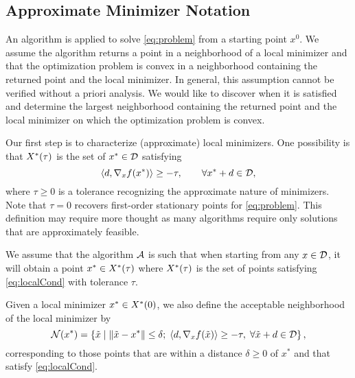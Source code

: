 \subsection{Approximate Minimizer Notation}

An algorithm is applied to solve \eqref{eq:problem} from a starting 
point $x^0$.  We assume the algorithm returns a point in a
neighborhood of a local minimizer and that the optimization 
problem is convex in a neighborhood containing the returned 
point and the local minimizer.  In general, this assumption 
cannot be verified without a priori analysis.  We would
like to discover when it is satisfied and determine the 
largest neighborhood containing the returned point and 
the local minimizer on which the optimization problem 
is convex.

Our first step is to characterize (approximate) local minimizers. One 
possibility is that $X^*(\tau)$ is the set of $x^*\in\mathcal{D}$ satisfying
\begin{equation}
 \left \langle d, \nabla_x f(x^*)\right \rangle \geq -\tau, \qquad \forall 
x^*+d\in \mathcal{D},
 \label{eq:localCond}
\end{equation}
where $\tau\geq 0$ is a tolerance recognizing the approximate nature of 
minimizers.  Note that $\tau=0$ recovers first-order stationary points 
for \eqref{eq:problem}.  This definition may require more thought as
many algorithms require only solutions that are approximately 
feasible.


We assume that the algorithm $\mathcal{A}$ is such that when starting from any $x\in 
\mathcal{D}$, it will obtain a point $x^*\in X^*(\tau)$ where $X^*(\tau)$ is the
set of points satisfying \eqref{eq:localCond} with tolerance $\tau$.

Given a local minimizer $x^*\in X^*(0)$, we also define the acceptable 
neighborhood of the local minimizer by
\[
\mathcal{N}(x^*) = \left\{ \tilde{x} \; | \; \|\tilde{x} - x^*\| \leq 
\delta; \;  \left \langle d, \nabla_x f(\tilde{x})\right \rangle \geq -\tau, \; 
\forall \tilde{x}+d\in \mathcal{D} \right\},
\]
corresponding to those points that are within a distance $\delta\geq 0$ of 
$x^*$ and that satisfy \eqref{eq:localCond}.

